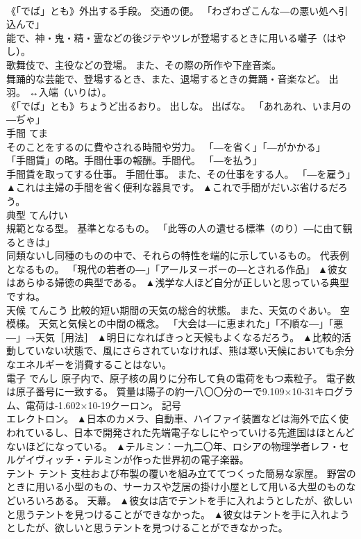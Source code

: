 \documentclass[8pt]{extreport}
\begin{document}
\begin{CJK}{UTF8}{min}
\\	《「でば」とも》外出する手段。 交通の便。 「わざわざこんな―の悪い処へ引込んで」 
\\	能で、神・鬼・精・霊などの後ジテやツレが登場するときに用いる囃子（はやし）。 
\\	歌舞伎で、主役などの登場。 また、その際の所作や下座音楽。 
\\	舞踊的な芸能で、登場するとき、また、退場するときの舞踊・音楽など。 出羽。 ↔入端（いりは）。 
\\	《「でば」とも》ちょうど出るおり。 出しな。 出ばな。 「あれあれ、いま月の―ぢゃ」	
\\	手間	てま	
\\	そのことをするのに費やされる時間や労力。 「―を省く」「―がかかる」 
\\	「手間賃」の略。手間仕事の報酬。手間代。 「―を払う」 
\\	手間賃を取ってする仕事。 手間仕事。 また、その仕事をする人。 「―を雇う」	▲これは主婦の手間を省く便利な器具です。 ▲これで手間がだいぶ省けるだろう。
\\	典型	てんけい	
\\	規範となる型。 基準となるもの。 「此等の人の遺せる標準（のり）―に由て観るときは」 
\\	同類ないし同種のものの中で、それらの特性を端的に示しているもの。 代表例となるもの。 「現代の若者の―」「アールヌーボーの―とされる作品」	▲彼女はあらゆる婦徳の典型である。 ▲浅学な人ほど自分が正しいと思っている典型ですね。
\\	天候	てんこう	比較的短い期間の天気の総合的状態。 また、天気のぐあい。 空模様。 天気と気候との中間の概念。 「大会は―に恵まれた」「不順な―」「悪―」→天気［用法］	▲明日になればきっと天候もよくなるだろう。 ▲比較的活動していない状態で、風にさらされていなければ、熊は寒い天候においても余分なエネルギーを消費することはない。
\\	電子	でんし	原子内で、原子核の周りに分布して負の電荷をもつ素粒子。 電子数は原子番号に一致する。 質量は陽子の約一八〇〇分の一で9.109×10-31キログラム、電荷は-1.602×10-19クーロン。 記号
\\	エレクトロン。	▲日本のカメラ、自動車、ハイファイ装置などは海外で広く使われているし、日本で開発された先端電子なしにやっていける先進国はほとんどないほどになっている。 ▲テルミン：一九二〇年、ロシアの物理学者レフ・セルゲイヴィッチ・テルミンが作った世界初の電子楽器。
\\	テント	テント	支柱および布製の覆いを組み立ててつくった簡易な家屋。 野営のときに用いる小型のもの、サーカスや芝居の掛け小屋として用いる大型のものなどいろいろある。 天幕。	▲彼女は店でテントを手に入れようとしたが、欲しいと思うテントを見つけることができなかった。 ▲彼女はテントを手に入れようとしたが、欲しいと思うテントを見つけることができなかった。

\end{CJK}
\end{document}
